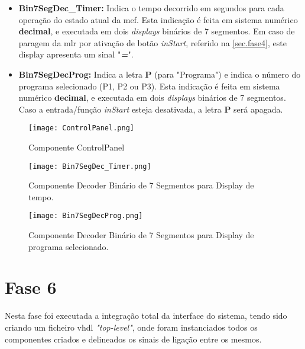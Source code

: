\begin{itemize}

	\item\textbf{Bin7SegDec\_Timer:} Indica o tempo decorrido em segundos para cada operação do estado atual da \ac{mef}. Esta indicação é feita em sistema numérico \textbf{decimal}, e executada em dois \textit{displays} binários de 7 segmentos. Em caso de paragem da \acf{mlr} por ativação de botão \textit{inStart}, referido na \autoref{sec.fase4}, este display apresenta um sinal "\textbf{\textit{=}}".
	
	
	\item\textbf{Bin7SegDecProg:} Indica a letra \textbf{P} (para "Programa") e indica o número do programa selecionado (P1, P2 ou P3). Esta indicação é feita em sistema numérico \textbf{decimal}, e executada em dois \textit{displays} binários de 7 segmentos. Caso a entrada/função \textit{inStart} esteja desativada, a letra \textbf{P} será apagada.
	
\end{itemize}


\begin{figure}[H]
	\centering
	\texttt{[image: ControlPanel.png]}
	\caption{Componente ControlPanel \\}
	\label{fig:control_panel}
\end{figure} 

\begin{figure}[H]
	\centering
	\texttt{[image: Bin7SegDec\_Timer.png]}
	\caption{Componente Decoder Binário de 7 Segmentos para Display de tempo. \\}
	\label{fig:bin7segdec_timer}
\end{figure} 

\begin{figure}[H]
	\centering
	\texttt{[image: Bin7SegDecProg.png]}
	\caption{Componente Decoder Binário de 7 Segmentos para Display de programa selecionado. \\}
	\label{fig:bin7segdecprog}
\end{figure} 
	
  

\section{Fase 6}
\label{sec.fase6}

Nesta fase foi executada a integração total da interface do sistema, tendo sido criando um ficheiro \ac{vhdl} \textit{"top-level"}, onde foram instanciados todos os componentes criados e delineados os sinais de ligação entre os mesmos.

